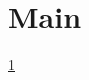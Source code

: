 \documentclass[11pt,reqno]{amsart}
\begin{document}
\section{Main}
\label{sec:main}

\ref{sec:main}



\end{document}
